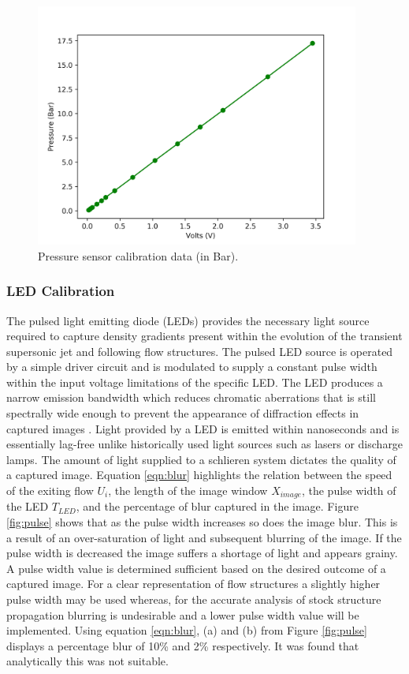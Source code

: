 \begin{figure}[H] 
	\centering
	\includegraphics[width=0.95\textwidth]{pressure2.png} 
	\caption{Pressure sensor calibration data (in Bar).}
	\label{fig:p_test}
\end{figure}

\subsubsection{LED Calibration}
The pulsed light emitting diode (LEDs) provides the necessary light source required to capture density gradients present within the evolution of the transient supersonic jet and following flow structures. The pulsed LED source is operated by a simple driver circuit and is modulated to supply a constant pulse width within the input voltage limitations of the specific LED. The LED produces a narrow emission bandwidth which reduces chromatic aberrations that is still spectrally wide enough to prevent the appearance of diffraction effects in captured images \citep{willert2012assessment}. Light provided by a LED is emitted within nanoseconds and is essentially lag-free unlike historically used light sources such as lasers or discharge lamps. The amount of light supplied to a schlieren system dictates the quality of a captured image. Equation \ref{eqn:blur} highlights the relation between the speed of the exiting flow $U_i$, the length of the image window $X_{image}$, the pulse width of the LED $T_{LED}$, and the percentage of blur captured in the image. Figure \ref{fig:pulse} shows that as the pulse width increases so does the image blur. This is a result of an over-saturation of light and subsequent blurring of the image. If the pulse width is decreased the image suffers a shortage of light and appears grainy. A pulse width value is determined sufficient based on the desired outcome of a captured image. For a clear representation of flow structures a slightly higher pulse width may be used whereas, for the accurate analysis of stock structure propagation blurring is undesirable and a lower pulse width value will be implemented. Using equation \ref{eqn:blur}, (a) and (b) from Figure \ref{fig:pulse} displays a percentage blur of 10\% and 2\% respectively. It was found that analytically this was not suitable.



